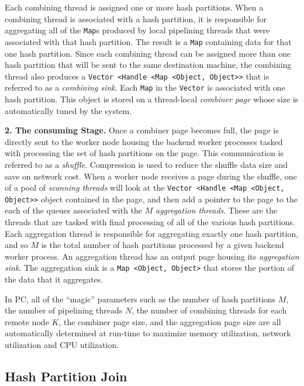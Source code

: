 Each combining thread is assigned one or more hash partitions.  When a combining thread
is associated with a hash partition, it is responsible for 
aggregating all of the \texttt{Map}s produced by local pipelining threads that were associated with that hash partition.
The result is a 
\texttt{Map} containing data for that one hash partition.  Since each combining
thread can be assigned more than one hash partition that will be sent to the same destination machine,
the combining thread also produces a \texttt{Vector <Handle <Map <Object, Object>>} that is referred to as a \emph{combining sink}.
Each \texttt{Map} in the \texttt{Vector} is associated with one hash partition.
This object is stored on a thread-local \emph{combiner page} whose size is automatically tuned by the system.

\vspace{5pt}
{\bf 2. The consuming Stage.}
Once a combiner page becomes full, the page is directly sent to the worker node housing the
backend worker processes tasked with processing the set of hash partitions on the page.
This communication is referred to as a \emph{shuffle}.  
Compression is used to reduce the shuffle data size and save on network cost.
When a worker node receives a page during the shuffle, one of a pool of \emph{scanning threads} will look at the 
\texttt{Vector <Handle <Map <Object, Object>>} object contained in the page, and then add a pointer to the page
to the each of the queues associated with the $M$ \emph{aggregation threads}.  These are the threads
that are tasked with final processing of all of the various hash partitions.
Each aggregation thread is responsible for aggregating exactly 
one hash partition, and so $M$ is the total number of hash partitions processed by a given backend worker process.
An aggregation thread has an output page housing its \emph{aggregation sink}.  The aggregation sink is a \texttt{Map <Object, Object>} that stores the portion of the
data that it aggregates.

 
In PC, all of the ``magic'' parameters such as the number of hash partitions $M$, 
the number of pipelining threads $N$, 
the number of combining threads for each remote node $K$, 
the combiner page size, and the aggregation page size are all automatically 
determined at run-time to maximize memory utilization, network utilization and CPU utilization. 

\subsection{Hash Partition Join}


